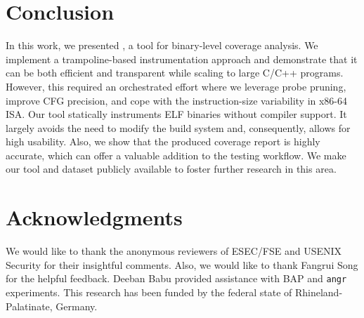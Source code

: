 
\section{Conclusion}

In this work, we presented {\bcov}, a tool for binary-level coverage analysis.
We implement a trampoline-based instrumentation approach and demonstrate that it can be both efficient and transparent while scaling to large C/C++ programs.
However, this required an orchestrated effort where we leverage probe pruning, improve CFG precision, and cope with the instruction-size variability in x86-64 ISA.
Our tool statically instruments ELF binaries without compiler support. 
It largely avoids the need to modify the build system and, consequently, allows for high usability.
Also, we show that the produced coverage report is highly accurate, which can offer a valuable addition to the testing workflow.
We make our tool and dataset publicly available to foster further research in this area.

\section*{Acknowledgments}
We would like to thank the anonymous reviewers of  ESEC/FSE and USENIX Security for their insightful comments. 
Also, we would like to thank Fangrui Song for the helpful feedback.
Deeban Babu provided assistance with BAP and \texttt{angr} experiments. 
This research has been funded by the federal state of Rhineland-Palatinate, Germany.

\balance




